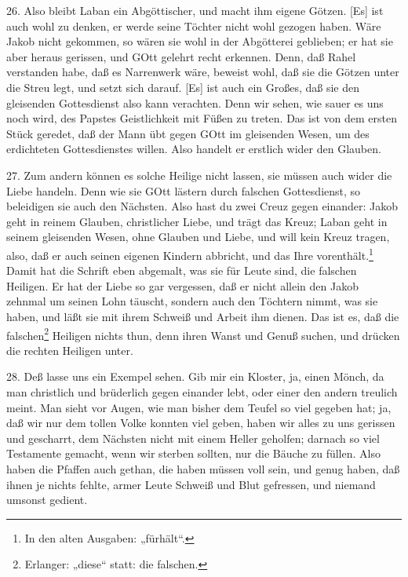 26. Also bleibt Laban ein Abgöttischer, und macht ihm eigene Götzen. [Es] ist auch wohl zu denken, er werde seine Töchter nicht wohl gezogen haben. Wäre Jakob nicht gekommen, so wären sie wohl in der Abgötterei geblieben; er hat sie aber heraus gerissen, und GOtt gelehrt recht erkennen. Denn, daß Rahel verstanden habe, daß es Narrenwerk wäre, beweist wohl, daß sie die Götzen unter die Streu legt, und setzt sich darauf. [Es] ist auch ein Großes, daß sie den gleisenden Gottesdienst also kann verachten. Denn wir sehen, wie sauer es uns noch wird, des Papstes Geistlichkeit mit Füßen zu treten. Das ist von dem ersten Stück geredet, daß der Mann übt gegen GOtt im gleisenden Wesen, um des erdichteten Gottesdienstes willen. Also handelt er erstlich wider den Glauben.

27. Zum andern können es solche Heilige nicht lassen, sie müssen auch wider die Liebe handeln. Denn wie sie GOtt lästern durch falschen Gottesdienst, so beleidigen sie auch den Nächsten. Also hast du zwei Creuz gegen einander: Jakob geht in reinem Glauben, christlicher Liebe, und trägt das Kreuz; Laban geht in seinem gleisenden Wesen, ohne Glauben und Liebe, und will kein Kreuz tragen, also, daß er auch seinen eigenen Kindern abbricht, und das Ihre vorenthält.\footnote{In den alten Ausgaben: „fürhält“.} Damit hat die Schrift eben abgemalt, was sie für Leute sind, die falschen Heiligen. Er hat der Liebe so gar vergessen, daß er nicht allein den Jakob zehnmal um seinen Lohn täuscht, sondern auch den Töchtern nimmt, was sie haben, und läßt sie mit ihrem Schweiß und Arbeit ihm dienen. Das ist es, daß die falschen\footnote{Erlanger: „diese“ statt: die falschen.} Heiligen nichts thun, denn ihren Wanst und Genuß suchen, und drücken die rechten Heiligen unter.

28. Deß lasse uns ein Exempel sehen. Gib mir ein Kloster, ja, einen Mönch, da man christlich und brüderlich gegen einander lebt, oder einer den andern treulich meint. Man sieht vor Augen, wie man bisher dem Teufel so viel gegeben hat; ja, daß wir nur dem tollen Volke konnten viel geben, haben wir alles zu uns gerissen und gescharrt, dem Nächsten nicht mit einem Heller geholfen; darnach so viel Testamente gemacht, wenn wir sterben sollten, nur die Bäuche zu füllen. Also haben die Pfaffen auch gethan, die haben müssen voll sein, und genug haben, daß ihnen je nichts fehlte, armer Leute Schweiß und Blut gefressen, und niemand umsonst gedient.

